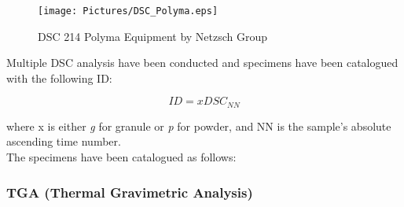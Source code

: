 \documentclass{article}
\begin{document}
                    \begin{figure}[h!]
                        \centering
                        \texttt{[image: Pictures/DSC\_Polyma.eps]}
                        \caption{DSC 214 Polyma Equipment by Netzsch Group}
                        \label{fig:DSC_polyma}
                    \end{figure}

                Multiple DSC analysis have been conducted and specimens have been catalogued with the following ID: 

                \begin{equation}
                    ID = xDSC_{NN}
                    \label{eq:DSC_ID}
                \end{equation}

                where x is either \textit{g} for granule or \textit{p} for powder, and NN is the sample's absolute 
                ascending time number. \\

                The specimens have been catalogued as follows: 

                \begin{table}[h!]
                    \centering
                    \caption{Selected DSC specimens representing a granule and a powder sample}
              
              \label{tab:DSC_ID}
              \end{table} 

              \clearpage

        \subsubsection{TGA (Thermal Gravimetric Analysis)\label{TGA_Analysis}}
        
\end{document}
